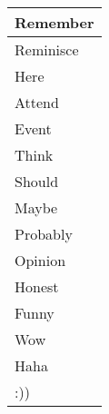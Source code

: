 \begin{longtable}{|p{3cm}|}
Remember\\ \hline
Reminisce\\ \hline
Here\\ \hline
Attend\\ \hline
Event\\ \hline
Think\\ \hline
Should\\ \hline
Maybe\\ \hline
Probably\\ \hline
Opinion\\ \hline
Honest\\ \hline
Funny\\ \hline
Wow\\ \hline
Haha\\ \hline
:))\\ \hline
\end{longtable}